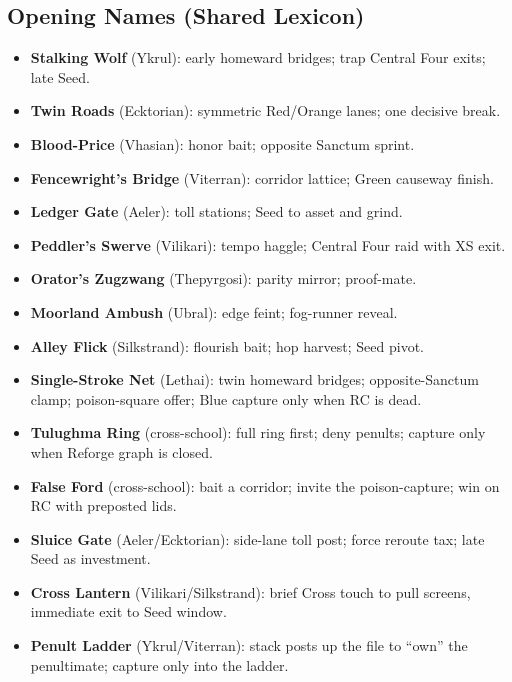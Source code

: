 \documentclass[11pt]{article}
\begin{document}
\subsection*{Opening Names (Shared Lexicon)}
\begin{itemize}\itemsep0.2em
  \item \textbf{Stalking Wolf} (Ykrul): early homeward bridges; trap Central Four exits; late Seed.
  \item \textbf{Twin Roads} (Ecktorian): symmetric Red/Orange lanes; one decisive break.
  \item \textbf{Blood-Price} (Vhasian): honor bait; opposite Sanctum sprint.
  \item \textbf{Fencewright’s Bridge} (Viterran): corridor lattice; Green causeway finish.
  \item \textbf{Ledger Gate} (Aeler): toll stations; Seed to asset and grind.
  \item \textbf{Peddler’s Swerve} (Vilikari): tempo haggle; Central Four raid with XS exit.
  \item \textbf{Orator’s Zugzwang} (Thepyrgosi): parity mirror; proof-mate.
  \item \textbf{Moorland Ambush} (Ubral): edge feint; fog-runner reveal.
  \item \textbf{Alley Flick} (Silkstrand): flourish bait; hop harvest; Seed pivot.
  \item \textbf{Single-Stroke Net} (Lethai): twin homeward bridges; opposite-Sanctum clamp; poison-square offer; Blue capture only when RC is dead.
  \item \textbf{Tulughma Ring} (cross-school): full ring first; deny penults; capture only when Reforge graph is closed.
  \item \textbf{False Ford} (cross-school): bait a corridor; invite the poison-capture; win on RC with preposted lids.
  \item \textbf{Sluice Gate} (Aeler/Ecktorian): side-lane toll post; force reroute tax; late Seed as investment.
  \item \textbf{Cross Lantern} (Vilikari/Silkstrand): brief Cross touch to pull screens, immediate exit to Seed window.
  \item \textbf{Penult Ladder} (Ykrul/Viterran): stack posts up the file to “own” the penultimate; capture only into the ladder.
\end{itemize}
\end{document}
